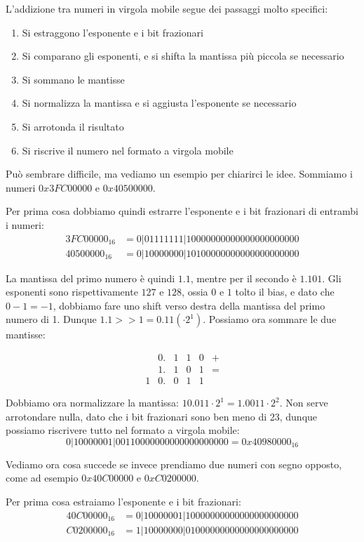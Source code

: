 \documentclass[11pt, a4paper, titlepage, oneside]{scrbook}
\begin{document}
L'addizione tra numeri in virgola mobile segue dei passaggi molto specifici:
\begin{enumerate}[label=\arabic*°]
    \item Si estraggono l'esponente e i bit frazionari
    \item Si comparano gli esponenti, e si shifta la mantissa più piccola se necessario
    \item Si sommano le mantisse
    \item Si normalizza la mantissa e si aggiusta l'esponente se necessario
    \item Si arrotonda il risultato
    \item Si riscrive il numero nel formato a virgola mobile
\end{enumerate}

Può sembrare difficile, ma vediamo un esempio per chiarirci le idee. Sommiamo i numeri $0x3FC00000$ e $0x40500000$.

Per prima cosa dobbiamo quindi estrarre l'esponente e i bit frazionari di entrambi i numeri:
\begin{align*}
3FC00000_{16} &= 0|01111111|10000000000000000000000 \\
40500000_{16} &= 0|10000000|10100000000000000000000
\end{align*}

La mantissa del primo numero è quindi $1.1$, mentre per il secondo è $1.101$. Gli esponenti sono rispettivamente $127$ e $128$, ossia $0$ e $1$ tolto il bias, e dato che $0 - 1= - 1$, dobbiamo fare uno shift verso destra della mantissa del primo numero di 1. Dunque $1.1 >> 1 = 0.11 (\cdot 2^1)$. Possiamo ora sommare le due mantisse:

\[
\begin{array}{rccccc}
& 0. & 1 & 1 & 0 & + \\
& 1. & 1 & 0 & 1 & = \\
\hline
1 & 0. & 0 & 1 & 1 &
\end{array}
\]

Dobbiamo ora normalizzare la mantissa: $10.011 \cdot 2^1 = 1.0011 \cdot 2^2$. Non serve arrotondare nulla, dato che i bit frazionari sono ben meno di 23, dunque possiamo riscrivere tutto nel formato a virgola mobile:
\[
0|10000001|00110000000000000000000 = 0x40980000_{16}
\]

Vediamo ora cosa succede se invece prendiamo due numeri con segno opposto, come ad esempio $0x40C00000$ e $0xC0200000$. 

Per prima cosa estraiamo l'esponente e i bit frazionari:
\begin{align*}
40C00000_{16} &= 0|10000001|10000000000000000000000 \\
C0200000_{16} &= 1|10000000|01000000000000000000000
\end{align*}
\end{document}
